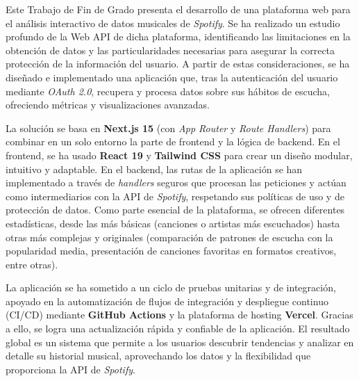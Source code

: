 Este Trabajo de Fin de Grado presenta el desarrollo de una plataforma web para el análisis interactivo de datos musicales de \textit{Spotify}. Se ha realizado un estudio profundo de la Web API de dicha plataforma, identificando las limitaciones en la obtención de datos y las particularidades necesarias para asegurar la correcta protección de la información del usuario. A partir de estas consideraciones, se ha diseñado e implementado una aplicación que, tras la autenticación del usuario mediante \textit{OAuth 2.0}, recupera y procesa datos sobre sus hábitos de escucha, ofreciendo métricas y visualizaciones avanzadas.

La solución se basa en \textbf{Next.js 15} (con \textit{App Router} y \textit{Route Handlers}) para combinar en un solo entorno la parte de frontend y la lógica de backend. En el frontend, se ha usado \textbf{React 19} y \textbf{Tailwind CSS} para crear un diseño modular, intuitivo y adaptable. En el backend, las rutas de la aplicación se han implementado a través de \textit{handlers} seguros que procesan las peticiones y actúan como intermediarios con la API de \textit{Spotify}, respetando sus políticas de uso y de protección de datos. Como parte esencial de la plataforma, se ofrecen diferentes estadísticas, desde las más básicas (canciones o artistas más escuchados) hasta otras más complejas y originales (comparación de patrones de escucha con la popularidad media, presentación de canciones favoritas en formatos creativos, entre otras).

La aplicación se ha sometido a un ciclo de pruebas unitarias y de integración, apoyado en la automatización de flujos de integración y despliegue continuo (CI/CD) mediante \textbf{GitHub Actions} y la plataforma de hosting \textbf{Vercel}. Gracias a ello, se logra una actualización rápida y confiable de la aplicación. El resultado global es un sistema que permite a los usuarios descubrir tendencias y analizar en detalle su historial musical, aprovechando los datos y la flexibilidad que proporciona la API de \textit{Spotify}.